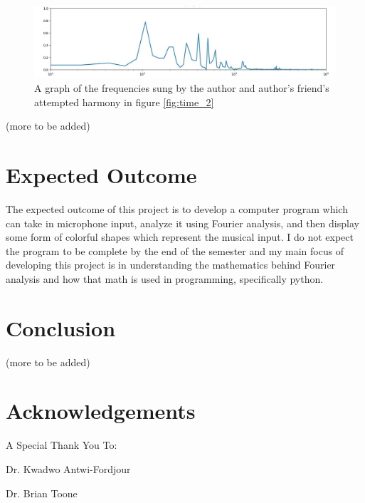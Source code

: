 \documentclass[10pt]{article}
\begin{document}
\begin{figure}[H]
    \centering
    \includegraphics[width=1.05\textwidth]{Matt_1_freq}
    \caption{A graph of the frequencies sung by the author and author's friend's attempted harmony in figure \ref{fig:time_2}}
    \label{fig:frequency_2}
\end{figure}

\noindent(more to be added)

\section{Expected Outcome}
\noindent\hspace{\parindent}The expected outcome of this project is to develop a computer program which can take in microphone input, analyze it using Fourier analysis, and then display some form of colorful shapes which represent the musical input. I do not expect the program to be complete by the end of the semester and my main focus of developing this project is in understanding the mathematics behind Fourier analysis and how that math is used in programming, specifically python.

\section{Conclusion}
\noindent(more to be added)

\section{Acknowledgements}
A Special Thank You To:

\vspace{2mm}\noindent\hspace{\parindent}Dr. Kwadwo Antwi-Fordjour

\vspace{2mm}\noindent\hspace{\parindent}Dr. Brian Toone
\end{document}
